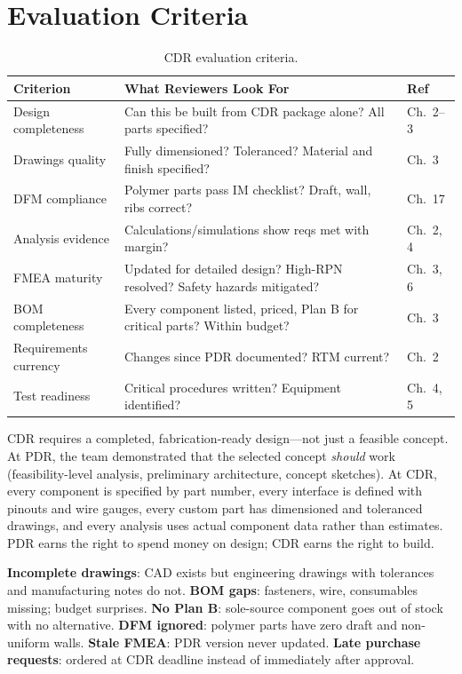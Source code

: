 \section{Evaluation Criteria}

\begin{table}[htbp]\centering\small
\begin{tabularx}{\textwidth}{l X l}
\toprule
\textbf{Criterion} & \textbf{What Reviewers Look For} & \textbf{Ref} \\
\midrule
Design completeness & Can this be built from CDR package alone? All parts specified? & Ch.~2--3 \\
Drawings quality & Fully dimensioned? Toleranced? Material and finish specified? & Ch.~3 \\
DFM compliance & Polymer parts pass IM checklist? Draft, wall, ribs correct? & Ch.~17 \\
Analysis evidence & Calculations/simulations show reqs met with margin? & Ch.~2, 4 \\
FMEA maturity & Updated for detailed design? High-RPN resolved? Safety hazards mitigated? & Ch.~3, 6 \\
BOM completeness & Every component listed, priced, Plan B for critical parts? Within budget? & Ch.~3 \\
Requirements currency & Changes since PDR documented? RTM current? & Ch.~2 \\
Test readiness & Critical procedures written? Equipment identified? & Ch.~4, 5 \\
\bottomrule
\end{tabularx}
\caption{CDR evaluation criteria.}
\end{table}

\begin{tipbox}
CDR requires a completed, fabrication-ready design---not just a feasible concept. At PDR, the team demonstrated that the selected concept \emph{should} work (feasibility-level analysis, preliminary architecture, concept sketches). At CDR, every component is specified by part number, every interface is defined with pinouts and wire gauges, every custom part has dimensioned and toleranced drawings, and every analysis uses actual component data rather than estimates. PDR earns the right to spend money on design; CDR earns the right to build.
\end{tipbox}

\begin{tipbox}
\textbf{Incomplete drawings}: CAD exists but engineering drawings with tolerances and manufacturing notes do not. \textbf{BOM gaps}: fasteners, wire, consumables missing; budget surprises. \textbf{No Plan B}: sole-source component goes out of stock with no alternative. \textbf{DFM ignored}: polymer parts have zero draft and non-uniform walls. \textbf{Stale FMEA}: PDR version never updated. \textbf{Late purchase requests}: ordered at CDR deadline instead of immediately after approval.
\end{tipbox}

